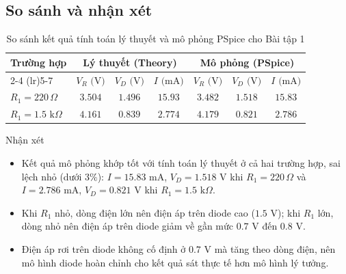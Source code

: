 \subsection{So sánh và nhận xét}
\begin{table}[H]
  \centering
  \caption{So sánh kết quả tính toán lý thuyết và mô phỏng PSpice cho Bài tập 1}
  \begin{tabular}{lcccccc}
    \toprule
    \textbf{Trường hợp} & \multicolumn{3}{c}{\textbf{Lý thuyết (Theory)}} & \multicolumn{3}{c}{\textbf{Mô phỏng (PSpice)}} \\
    \cmidrule(lr){2-4} \cmidrule(lr){5-7}
    & $V_R\text{ (V)}$ & $V_D\text{ (V)}$ & $I\text{ (mA)}$ & $V_R\text{ (V)}$ & $V_D\text{ (V)}$ & $I\text{ (mA)}$ \\
    \midrule
    $R_1 = 220\,\Omega$ & $3.504$ & $1.496$ & $15.93$ & $3.482$ & $1.518$ & $15.83$ \\
    $R_1 = 1.5\text{ k}\Omega$ & $4.161$ & $0.839$ & $2.774$ & $4.179$ & $0.821$ & $2.786$ \\
    \bottomrule
  \end{tabular}
\end{table}

\begin{notebox}{Nhận xét}
\begin{itemize}[leftmargin=1.5em,itemsep=2pt,topsep=0pt]
  \item Kết quả mô phỏng khớp tốt với tính toán lý thuyết ở cả hai trường hợp, sai lệch nhỏ (dưới $3\%$): $I = 15.83\text{ mA}$, $V_D = 1.518\text{ V}$ khi $R_1 = 220\,\Omega$ và $I = 2.786\text{ mA}$, $V_D = 0.821\text{ V}$ khi $R_1 = 1.5\text{ k}\Omega$.
  \item Khi $R_1$ nhỏ, dòng điện lớn nên điện áp trên diode cao ($1.5\text{ V}$); khi $R_1$ lớn, dòng nhỏ nên điện áp trên diode giảm về gần mức $0.7\text{ V}$ đến $0.8\text{ V}$.
  \item Điện áp rơi trên diode không cố định ở $0.7\text{ V}$ mà tăng theo dòng điện, nên mô hình diode hoàn chỉnh cho kết quả sát thực tế hơn mô hình lý tưởng.
\end{itemize}
\end{notebox}
